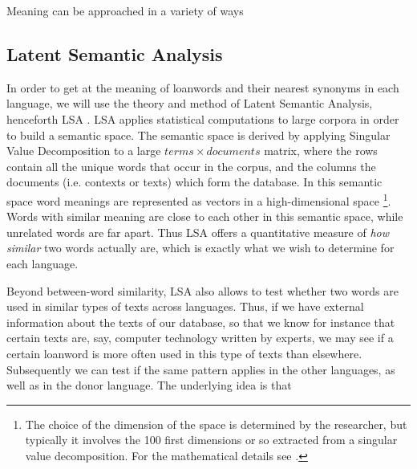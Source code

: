 \documentclass[a4paper]{article}
\begin{document}
Meaning can be approached in a variety of ways \citep{Koptjevskaja-Tamm2008}




\subsection{Latent Semantic Analysis}

In order to get at the meaning of loanwords and their nearest synonyms in each language, we will use the theory and method of Latent Semantic Analysis, henceforth LSA \citep{Deerwester1990, Landauer1999, Dumais2004}.
LSA applies statistical computations to large corpora in order to build a semantic space.
The semantic space is derived by applying Singular Value Decomposition to a large $ terms \times documents$ matrix, where the rows contain all the unique words that occur in the corpus, and the columns the documents (i.e. contexts or texts) which form the database.
In this semantic space word meanings are represented as vectors in a high-dimensional space%
\footnote{The choice of the dimension of the space is determined by the researcher, but typically it involves the 100 first dimensions or so extracted from a singular value decomposition. For the mathematical details see \citet{Deerwester1990}.}.
Words with similar meaning are close to each other in this semantic space, while unrelated words are far apart.
Thus LSA offers a quantitative measure of \emph{how similar} two words actually are, which is exactly what we wish to determine for each language.

Beyond between-word similarity, LSA also allows  to test whether two words are used in similar types of texts across languages.
Thus, if we have external information about the texts of our database, so that we know for instance that certain texts are, say, computer technology written by experts, we may see if a certain loanword is more often used in this type of texts than elsewhere.
Subsequently we can test if the same pattern applies in the other languages, as well as in the donor language.
The underlying idea is that


\end{document}
